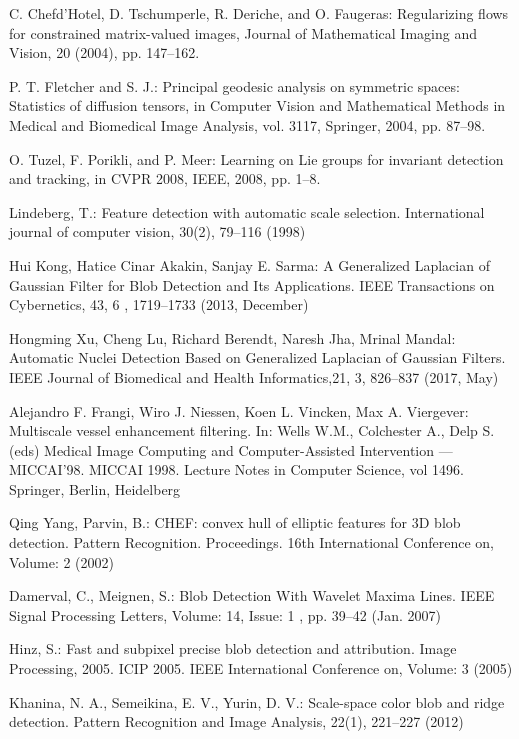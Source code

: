\documentclass[twocolumn]{svjour3}          %
\begin{document}
\begin{thebibliography}{16}
C. Chefd’Hotel, D. Tschumperle, R. Deriche, and O. Faugeras:
Regularizing flows for constrained matrix-valued images, 
Journal of Mathematical Imaging and Vision, 20 (2004), pp. 147–162.

P. T. Fletcher and S. J.:
Principal geodesic analysis on symmetric spaces: Statistics of diffusion tensors, 
in Computer Vision and Mathematical Methods in Medical and Biomedical Image Analysis, vol. 3117, Springer, 2004, pp. 87–98.

O. Tuzel, F. Porikli, and P. Meer:
Learning on Lie groups for invariant detection and tracking,
in CVPR 2008, IEEE, 2008, pp. 1–8.

Lindeberg, T.:
Feature detection with automatic scale selection. 
International journal of computer vision, 30(2), 79--116 (1998)

Hui Kong, Hatice Cinar Akakin, Sanjay E. Sarma:
A Generalized Laplacian of Gaussian Filter for Blob Detection and Its Applications. 
IEEE Transactions on Cybernetics, 43, 6 , 1719--1733 (2013, December)

Hongming Xu, Cheng Lu, Richard Berendt, Naresh Jha, Mrinal Mandal:
Automatic Nuclei Detection Based on Generalized Laplacian of Gaussian Filters.
IEEE Journal of Biomedical and Health Informatics,21, 3, 826--837 (2017, May)

Alejandro F. Frangi, Wiro J. Niessen, Koen L. Vincken, Max A. Viergever:
Multiscale vessel enhancement filtering.
In: Wells W.M., Colchester A., Delp S. (eds) Medical Image Computing and Computer-Assisted Intervention — MICCAI’98. MICCAI 1998. Lecture Notes in Computer Science, vol 1496. Springer, Berlin, Heidelberg

Qing Yang, Parvin, B.:
CHEF: convex hull of elliptic features for 3D blob detection.
Pattern Recognition. Proceedings. 16th International Conference on, Volume: 2 (2002)

Damerval, C., Meignen, S.:
Blob Detection With Wavelet Maxima Lines.
IEEE Signal Processing Letters, Volume: 14, Issue: 1 , pp. 39--42 (Jan. 2007)

Hinz, S.:
Fast and subpixel precise blob detection and attribution.
Image Processing, 2005. ICIP 2005. IEEE International Conference on, Volume: 3 (2005)

Khanina, N. A., Semeikina, E. V., Yurin, D. V.:
Scale-space color blob and ridge detection. 
Pattern Recognition and Image Analysis, 22(1), 221--227 (2012)


\end{thebibliography}
\end{document}
